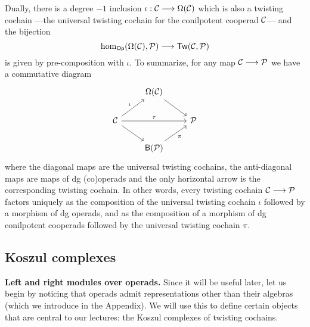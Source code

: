 Dually, there is a degree $-1$ inclusion $\iota:
\mathcal{C}\longrightarrow \Omega(\mathcal{C})$ which is also a 
twisting cochain ---the universal twisting cochain
for the conilpotent cooperad $\mathcal{C}$--- and the bijection
\[
\hom_{\mathsf{Op}}(\Omega(\mathcal{C}),{\mathcal{P}})
 	\longrightarrow
 	 \mathsf{Tw}(\mathcal{C},{\mathcal{P}})
\]
is given by pre-composition with $\iota$. To summarize,
for any map $\mathcal{C}\longrightarrow {\mathcal{P}}$ we have a commutative
diagram
\[
\begin{tikzcd}
{} & \Omega(\CC) \arrow[dr] & {} \\
\CC \arrow[ur,"\iota"]
	\arrow[dr]
	\arrow[rr,"\tau"] & {} & \PP \\
{} & \B{\PP} \arrow[ur,"\pi",swap] & {} 
\end{tikzcd}
\]
where the diagonal maps are the universal twisting cochains, 
the anti-diagonal maps are maps of dg (co)operads and
the only horizontal arrow is the corresponding twisting cochain.
In other words, every twisting cochain $\mathcal{C}\longrightarrow {\mathcal{P}}$
factors uniquely as the composition of the universal twisting
cochain $\iota$ followed by a morphism of dg operads, and
as the composition of a morphism of dg conilpotent cooperads
followed by the universal twisting cochain $\pi$.

\subsection{Koszul complexes}

\textbf{Left and right modules over operads.} Since it will be useful
later, let us begin by noticing that operads admit representations other
than their algebras (which we introduce in the Appendix). We will
use this to define certain objects that are central to our lectures:
the Koszul complexes of twisting cochains.

